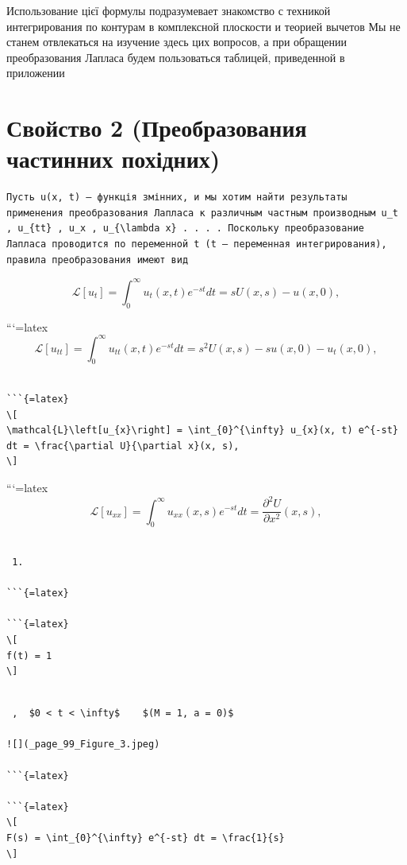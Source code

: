 \documentclass[
  ukrainian,
]{article}
\begin{document}
Использование цієї формулы подразумевает знакомство с техникой
интегрирования по контурам в комплексной плоскости и теорией вычетов Мы
не станем отвлекаться на изучение здесь цих вопросов, а при обращении
преобразования Лапласа будем пользоваться таблицей, приведенной в
приложении

\section{Свойство 2 (Преобразования частинних
похідних)}\label{ux441ux432ux43eux439ux441ux442ux432ux43e-2-ux43fux440ux435ux43eux431ux440ux430ux437ux43eux432ux430ux43dux438ux44f-ux447ux430ux441ux442ux438ux43dux43dux438ux445-ux43fux43eux445ux456ux434ux43dux438ux445}

\begin{verbatim}
Пусть u(x, t) — функція змінних, и мы хотим найти результаты применения преобразования Лапласа к различным частным производным u_t , u_{tt} , u_x , u_{\lambda x} . . . . Поскольку преобразование Лапласа проводится по переменной t (t — переменная интегрирования), правила преобразования имеют вид
\end{verbatim}

\[
\mathcal{L}\left[u_{t}\right] = \int_{0}^{\infty} u_{t}(x, t) e^{-st} dt = sU(x, s) - u(x, 0),
\]

```{=latex}
\[
\mathcal{L}\left[u_{tt}\right] = \int_{0}^{\infty} u_{tt}(x, t) e^{-st} dt = s^{2}U(x, s) - su(x, 0) - u_{t}(x, 0),
\]

\begin{verbatim}

```{=latex}
\[
\mathcal{L}\left[u_{x}\right] = \int_{0}^{\infty} u_{x}(x, t) e^{-st} dt = \frac{\partial U}{\partial x}(x, s),
\]
\end{verbatim}

```{=latex}
\[
\mathcal{L}\left[u_{xx}\right] = \int_{0}^{\infty} u_{xx}(x, s) e^{-st} dt = \frac{\partial^{2}U}{\partial x^{2}}(x, s),
\]

\begin{verbatim}

 1. 

```{=latex}

```{=latex}
\[
f(t) = 1
\]
\end{verbatim}

\begin{verbatim}

 ,  $0 < t < \infty$    $(M = 1, a = 0)$

![](_page_99_Figure_3.jpeg)

```{=latex}

```{=latex}
\[
F(s) = \int_{0}^{\infty} e^{-st} dt = \frac{1}{s}
\]
\end{verbatim}
\end{document}
